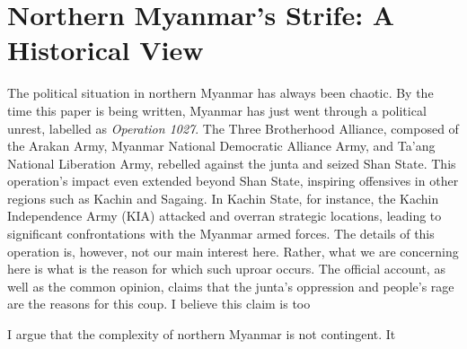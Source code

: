 \documentclass{article}
\begin{document}
\section{Northern Myanmar's Strife: A Historical View}

The political situation in northern Myanmar has always been chaotic. By the time this paper is being written, Myanmar has just went through a political unrest, labelled as \textit{Operation 1027}. The Three Brotherhood Alliance, composed of the Arakan Army, Myanmar National Democratic Alliance Army, and Ta’ang National Liberation Army, rebelled against the junta and seized Shan State.\autocite{yunsunOperation1027Changing2024} This operation's impact even extended beyond Shan State, inspiring offensives in other regions such as Kachin and Sagaing. In Kachin State, for instance, the Kachin Independence Army (KIA) attacked and overran strategic locations, leading to significant confrontations with the Myanmar armed forces. \autocite{theinternationalinstituteforstrategicstudiesOperation1027Reshapes2023} The details of this operation is, however, not our main interest here. Rather, what we are concerning here is what is the reason for which such uproar occurs. The official account, as well as the common opinion, claims that the junta's oppression and people's rage are the reasons for this coup. \autocite{htetminlwinOperation1027End2023} I believe this claim is too 


I argue that the complexity of northern Myanmar is not contingent. It 
\end{document}
